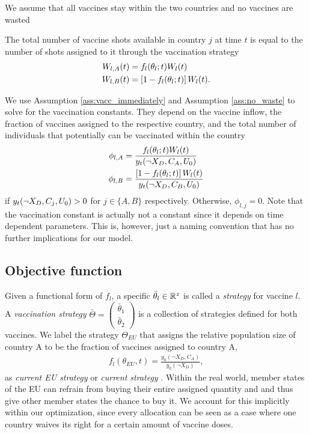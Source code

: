 We assume that all vaccines stay within the two countries and no vaccines are wasted
\begin{assumption}
\label{ass:no_waste}
The total number of vaccine shots available in country $j$ at time $t$ is equal to the number of shots assigned to it through the vaccination strategy
\begin{align}
\label{eq:vaccine_frac}
W_{l,A}(t) &= f_{l}(\theta_l; t) W_l(t) \\
W_{l,B}(t) &= \left[1 - f_{l}(\theta_l; t)\right] W_l(t) \notag.
\end{align}
\end{assumption}
\noindent We use Assumption \ref{ass:vacc_immediately} and Assumption \ref{ass:no_waste} to solve for the vaccination constants. They depend on the vaccine inflow, the fraction of vaccines assigned to the respective country, and the total number of individuals that potentially can be vaccinated within the country
\begin{align*}
\phi_{l,A} &= \frac{ f_{l}(\theta_l; t) W_{l}(t)}{y_t(\neg X_D, C_A, U_0) } \notag \\
\phi_{l,B} &= \frac{\left[1 - f_{l}(\theta_l; t)\right]  W_{l}(t)}{y_t(\neg X_D, C_B, U_0)}
\end{align*}
if $y_t(\neg X_D, C_j, U_0) > 0$ for $j \in \{A,B\}$ respectively. Otherwise, $\phi_{l,j} = 0$. Note that the vaccination constant is actually not a constant since it depends on time dependent parameters. This is, however, just a naming convention that has no further implications for our model.

\subsection{Objective function}
Given a functional form of $f_{l}$, a specific $\bar{\theta}_l \in  \mathbb{R}^z$ is called a \textit{strategy} for vaccine $l$. A \textit{vaccination strategy} $\bar \Theta = \begin{pmatrix}
\bar \theta_1 \\ \bar \theta_2
\end{pmatrix}$ is a collection of strategies defined for both vaccines. We label the strategy $\Theta_{EU}$ that assigns the relative population size of country A to be the fraction of vaccines assigned to country A,
\begin{align}
f_l(\theta_{EU}, t) = \frac{y_0(\neg X_D, C_A)}{y_0(\neg X_D)},
\end{align}
as \textit{current EU strategy} or \textit{current strategy} \citep{ec.2021}. Within the real world, member states of the EU can refrain from buying their entire assigned quantity and and thus give other member states the chance to buy it. We account for this implicitly within our optimization, since every allocation can be seen as a case where one country waives its right for a certain amount of vaccine doses. \\ %

